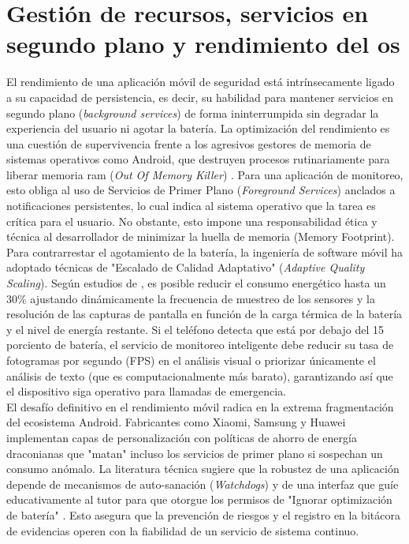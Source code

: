 \section{Gestión de recursos, servicios en segundo plano y rendimiento del \gls{os}}

El rendimiento de una aplicación móvil de seguridad está intrínsecamente ligado a su capacidad de persistencia, es decir, su habilidad para mantener servicios en segundo plano (\textit{background services}) de forma ininterrumpida sin degradar la experiencia del usuario ni agotar la batería. La optimización del rendimiento es una cuestión de supervivencia frente a los agresivos gestores de memoria de sistemas operativos como Android, que destruyen procesos rutinariamente para liberar memoria \gls{ram} (\textit{Out Of Memory Killer}) \cite{koulaxidis_improving_2022}. Para una aplicación de monitoreo, esto obliga al uso de Servicios de Primer Plano (\textit{Foreground Services}) anclados a notificaciones persistentes, lo cual indica al sistema operativo que la tarea es crítica para el usuario. No obstante, esto impone una responsabilidad ética y técnica al desarrollador de minimizar la huella de memoria (Memory Footprint).\\

Para contrarrestar el agotamiento de la batería, la ingeniería de software móvil ha adoptado técnicas de "Escalado de Calidad Adaptativo" (\textit{Adaptive Quality Scaling}). Según estudios de \cite{ali_efficient_2021}, es posible reducir el consumo energético hasta un 30\% ajustando dinámicamente la frecuencia de muestreo de los sensores y la resolución de las capturas de pantalla en función de la carga térmica de la batería y el nivel de energía restante. Si el teléfono detecta que está por debajo del 15 porciento de batería, el servicio de monitoreo inteligente debe reducir su tasa de fotogramas por segundo (FPS) en el análisis visual o priorizar únicamente el análisis de texto (que es computacionalmente más barato), garantizando así que el dispositivo siga operativo para llamadas de emergencia.\\



El desafío definitivo en el rendimiento móvil radica en la extrema fragmentación del ecosistema Android. Fabricantes como Xiaomi, Samsung y Huawei implementan capas de personalización con políticas de ahorro de energía draconianas que "matan" incluso los servicios de primer plano si sospechan un consumo anómalo. La literatura técnica sugiere que la robustez de una aplicación depende de mecanismos de auto-sanación (\textit{Watchdogs}) y de una interfaz que guíe educativamente al tutor para que otorgue los permisos de "Ignorar optimización de batería" \cite{rojas_technical_2025, ayyash_cybersecurity_2024}. Esto asegura que la prevención de riesgos y el registro en la bitácora de evidencias operen con la fiabilidad de un servicio de sistema continuo.\\

